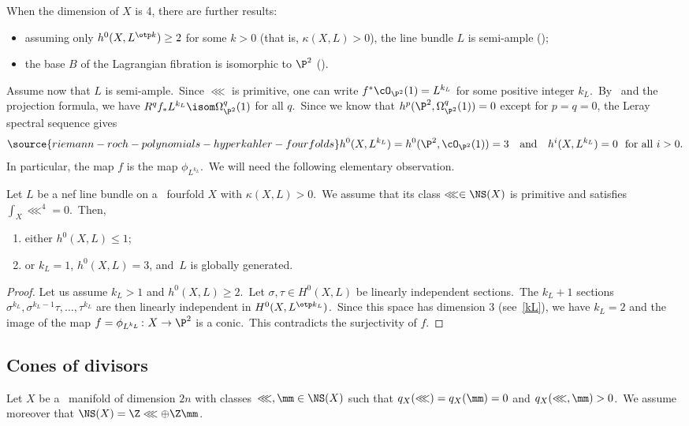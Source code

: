 When the dimension of $X$ is 4, there are further results:
\begin{itemize}
\item assuming only $h^0(X,L^{\otp k})\ge 2$ for some $k>0$ (that is,  $\kappa(X,L)>0$), the line bundle $L$ is semi-ample (\cite[Theorem~1.5]{fuk});
\item the base $B$ of the Lagrangian fibration is isomorphic to $\P^2$ (\cite{hx}).
\end{itemize}
Assume now that $L$ is semi-ample.\ Since $\lll$ is primitive, one can   write $f^*\cO_{\P^2}(1)=L^{k_L}$ for some positive integer $k_L$.\
By~\cite[Theorem~1.3]{mathigher} and the projection formula, we have
$R^qf_*L^{k_L} \isom \Omega_{\P^2}^q(1)$ for all $q$.\
Since we know that $h^p(\P^2,\Omega_{\P^2}^q(1))=0$ except for $p=q=0$, the Leray spectral sequence gives
\begin{equation}\label{kL}
\source{riemann-roch-polynomials-hyperkahler-fourfolds}
h^0(X,L^{k_L}) = h^0(\P^2, \cO_{\P^2}(1))=3\quad\textnormal{and}\quad h^i(X,L^{k_L}) =0\ \ \textnormal{for all } i>0.
\end{equation}
In particular, the map $f $ is the map $ \phi_{L^{k_L}}$.\ We will need the following elementary observation.

\begin{lemm}\label{lem:H0large}
Let $L$ be a nef line bundle on a  \hk\ fourfold $X$ with $\kappa(X,L)>0$.\
We assume that its class $\lll\in\NS(X)$ is primitive and satisfies $\int_X\lll^4=0$.\
Then,
\begin{enumerate}[{\rm (a)}]
\item either $h^0(X,L)\le1$;
\item or $k_L=1$, $h^0(X,L)=3$, and~$L$ is globally generated.
\end{enumerate}
\end{lemm}

\begin{proof}
Let us assume  $k_L>1$ and $h^0(X,L)\ge2$.\ Let $\sigma,\tau\in H^0(X,L)$ be
linearly independent sections.\ The $k_L+1$ sections  $\sigma^{k_L},\sigma^{k_L-1}\tau,\dots,\tau^{k_L}$ are then linearly independent in $H^0(X,L^{\otp k_L})$.\ Since this space has dimension 3 (see~\eqref{kL}), we have $k_L=2$ and the image of the map $f=\phi_{L^{k_L}}\colon X\to \P^2$ is a conic.\ This  contradicts the surjectivity of $f$.
\end{proof}


\subsection{Cones of divisors}\label{subsec:ConeDivisors}
Let $X$ be a \hk\ manifold of dimension $2n$ with   classes~$\lll, \mm\in \NS(X)$ such that $q_X(\lll)=q_X(\mm)=0$ and $q_X(\lll,\mm)>0$.\
We assume moreover that $\NS(X)=\Z \lll\oplus \Z \mm$.

